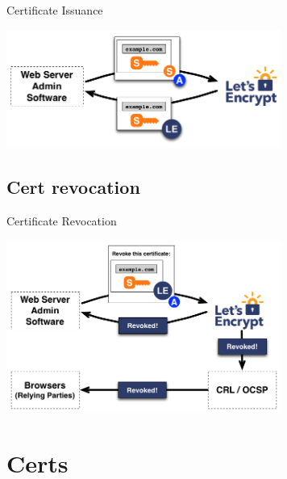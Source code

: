 \documentclass[xcolor=svgnames,11pt]{beamer}
\begin{document}
\begin{frame}{Certificate Issuance}
\begin{center}
\includegraphics[width=9cm]{img/proto_3.png}
\end{center}
\end{frame}

\subsection{Cert revocation}
\begin{frame}{Certificate Revocation}
\begin{center}
\includegraphics[width=9cm]{img/proto_4.png}
\end{center}
\end{frame}

\section{Certs}
\end{document}
